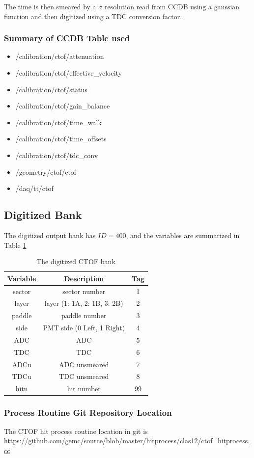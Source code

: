 The time is then smeared by a $\sigma$ resolution read from CCDB using a gaussian function and then digitized using a TDC conversion factor.



\subsubsection{Summary of CCDB Table used}

\begin{itemize}
	\item /calibration/ctof/attenuation
	\item /calibration/ctof/effective\_velocity
	\item /calibration/ctof/status
	\item /calibration/ctof/gain\_balance
	\item /calibration/ctof/time\_walk
	\item /calibration/ctof/time\_offsets
	\item /calibration/ctof/tdc\_conv
	\item /geometry/ctof/ctof
	\item /daq/tt/ctof
\end{itemize}


\subsection{Digitized Bank}

The digitized output bank has $ID=400$, and the variables are summarized in Table \ref{tab:ctofBank}

\begin{table}[h]
	\begin{center}
		\begin{tabular}{| c | c | c |}
			\hline \hline
			Variable         & Description  & Tag  \\
			\hline
              sector  &                             sector number  &    1 \\
               layer  &               layer (1: 1A, 2: 1B, 3: 2B)  &    2 \\
              paddle  &                             paddle number  &    3 \\
                side  &                PMT side (0 Left, 1 Right)  &    4 \\
                 ADC  &                                       ADC  &    5 \\
                 TDC  &                                       TDC  &    6 \\
                ADCu  &                             ADC unsmeared  &    7 \\
                TDCu  &                             TDC unsmeared  &    8 \\
                hitn  &                                hit number  &   99 \\
			\hline \hline
		\end{tabular}
	\end{center}
	\caption{The digitized CTOF bank}\label{tab:ctofBank}
\end{table}

\subsubsection{Process Routine Git Repository Location}
The CTOF hit process routine location in git is \url{https://github.com/gemc/source/blob/master/hitprocess/clas12/ctof_hitprocess.cc}
